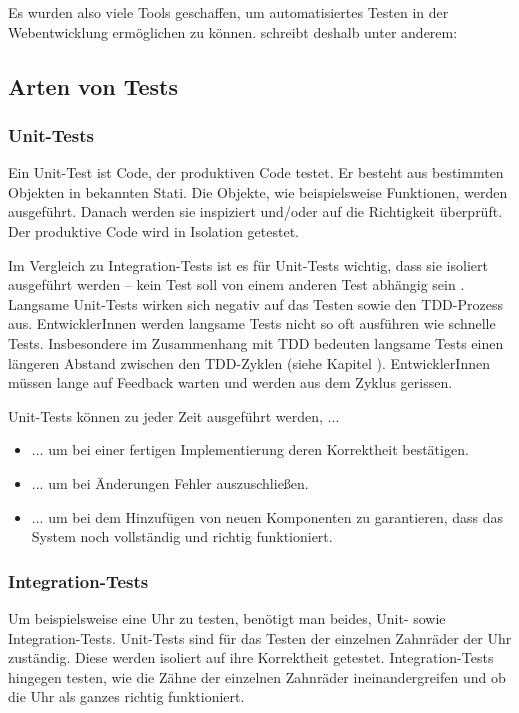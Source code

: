Es wurden also viele Tools geschaffen, um automatisiertes Testen in der Webentwicklung ermöglichen zu können. \cite[xix]{Johansen:2011} schreibt deshalb unter anderem: \textit{}

\subsection{Arten von Tests}
\subsubsection{Unit-Tests}
Ein Unit-Test ist Code, der produktiven Code testet. Er besteht aus bestimmten Objekten in bekannten Stati. Die Objekte, wie beispielsweise Funktionen, werden ausgeführt. Danach werden sie inspiziert und/oder auf die Richtigkeit überprüft. Der produktive Code wird in Isolation getestet.

Im Vergleich zu Integration-Tests ist es für Unit-Tests wichtig, dass sie isoliert ausgeführt werden -- kein Test soll von einem anderen Test abhängig sein \autocite[4]{Johansen:2011}. Langsame Unit-Tests wirken sich negativ auf das Testen sowie den TDD-Prozess aus. EntwicklerInnen werden langsame Tests nicht so oft ausführen wie schnelle Tests. Insbesondere im Zusammenhang mit TDD bedeuten langsame Tests einen längeren Abstand zwischen den TDD-Zyklen (siehe Kapitel ). EntwicklerInnen müssen lange auf Feedback warten und werden aus dem Zyklus gerissen.

Unit-Tests können zu jeder Zeit ausgeführt werden, ...
\begin{itemize}
  \item ... um bei einer fertigen Implementierung deren Korrektheit bestätigen.
  \item ... um bei Änderungen Fehler auszuschließen.
  \item ... um bei dem Hinzufügen von neuen Komponenten zu garantieren, dass das System noch vollständig und richtig funktioniert.
\end{itemize}

\subsubsection{Integration-Tests}
Um beispielsweise eine Uhr zu testen, benötigt man beides, Unit- sowie Integration-Tests. Unit-Tests sind für das Testen der einzelnen Zahnräder der Uhr zuständig. Diese werden isoliert auf ihre Korrektheit getestet. Integration-Tests hingegen testen, wie die Zähne der einzelnen Zahnräder ineinandergreifen und ob die Uhr als ganzes richtig funktioniert.

